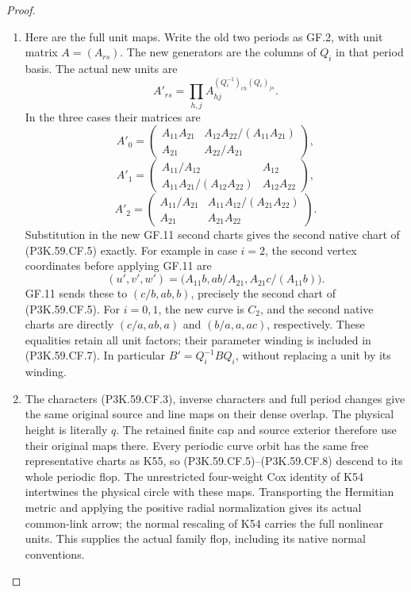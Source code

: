 \begin{proof}
\begin{enumerate}[label=\arabic*.]
\item Here are the full unit maps. Write the old two periods as GF.2,
with unit matrix \(A=(A_{rs})\). The new generators are the
columns of \(Q_i\) in that period basis. The actual new units are
\[
 A'_{rs}=\prod_{h,j}A_{hj}^{(Q_i^{-1})_{rh}(Q_i)_{js}}. \tag{P3K.59.CF.7}
\]
In the three cases their matrices are
\[
 A'_0=\begin{pmatrix}
 A_{11}A_{21}&A_{12}A_{22}/(A_{11}A_{21})\\
 A_{21}&A_{22}/A_{21}
 \end{pmatrix},
\]
\[
 A'_1=\begin{pmatrix}
 A_{11}/A_{12}&A_{12}\\
 A_{11}A_{21}/(A_{12}A_{22})&A_{12}A_{22}
 \end{pmatrix},
\]
\[
 A'_2=\begin{pmatrix}
 A_{11}/A_{21}&A_{11}A_{12}/(A_{21}A_{22})\\
 A_{21}&A_{21}A_{22}
 \end{pmatrix}.                                      \tag{P3K.59.CF.8}
\]
Substitution in the new GF.11 second charts gives the second
native chart of (P3K.59.CF.5) exactly. For example in case \(i=2\),
the second vertex coordinates before applying GF.11 are
\[
 (u',v',w')=\bigl(A_{11}b,ab/A_{21},A_{21}c/(A_{11}b)\bigr).
\]
GF.11 sends these to \((c/b,ab,b)\), precisely the second
chart of (P3K.59.CF.5). For \(i=0,1\), the new curve is \(C_2\),
and the second native charts are directly
\((c/a,ab,a)\) and \((b/a,a,ac)\), respectively.
These equalities retain all unit factors; their parameter winding
is included in (P3K.59.CF.7). In particular
\(B'=Q_i^{-1}BQ_i\), without replacing a unit by its winding.

\item The characters (P3K.59.CF.3), inverse characters and full period changes
give the same original source and line maps on their dense overlap.
The physical height is literally \(q\). The retained finite cap
and source exterior therefore use their original maps there.
Every periodic curve orbit has the same free representative charts
as K55, so (P3K.59.CF.5)--\allowbreak (P3K.59.CF.8) descend to its whole periodic flop.
The unrestricted four-weight Cox identity of K54 intertwines
the physical circle with these maps. Transporting the Hermitian
metric and applying the positive radial normalization gives its
actual common-link arrow; the normal rescaling of K54 carries
the full nonlinear units. This supplies the actual family flop,
including its native normal conventions.


\end{enumerate}
\end{proof}
